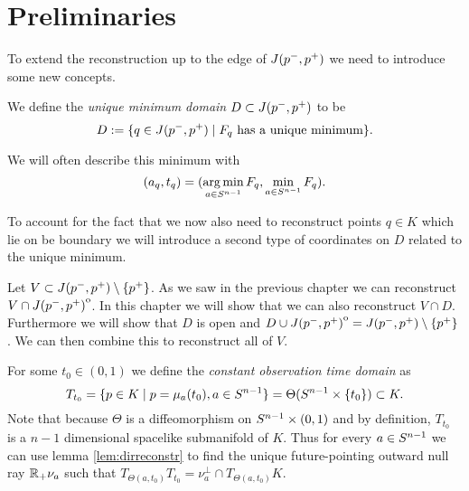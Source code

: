 \section{Preliminaries}
To extend the reconstruction up to the edge of $J(p^-,p^+)$ we need to introduce some new concepts.

\begin{definition}\label{def:uniquemindomain}
    We define the \emph{unique minimum domain} $D\subset J(p^-,p^+)$ to be 
    \begin{equation}
        D:=\{q\in J(p^-,p^+) \mid F_q\text{ has a unique minimum}\}.
    \end{equation}

    We will often describe this minimum with 
    \[
        (a_q,t_q)=(\operatorname*{arg\,min}_{a\in S^{n-1}} F_q, \min_{a\in S^{n-1}} F_q).
    \]
\end{definition}

\begin{remark}
    To account for the fact that we now also need to reconstruct points $q\in K$ which lie on be boundary we will introduce a second type of coordinates on $D$ related to the unique minimum.
    
    Let $V\subset J(p^-,p^+)\setminus \{p^+\}$. As we saw in the previous chapter we can reconstruct $V\cap {\kern0ptJ(p^-,p^+)}^{\mathrm{o}}$. In this chapter we will show that we can also reconstruct $V\cap D$. Furthermore we will show that $D$ is open and $D\cup {\kern0ptJ(p^-,p^+)}^{\mathrm{o}} = J(p^-,p^+)  \setminus \{p^+\}$. We can then combine this to reconstruct all of $V$.
\end{remark}


\begin{definition} For some $t_0\in (0,1)$ we define the \emph{constant observation time domain} as 
\begin{equation}
    T_{t_0} = \{p\in K \mid p=\mu_a(t_0), a\in S^{n-1}\} = \Theta(S^{n-1}\times \{t_0\}) \subset K.
\end{equation}
Note that because $\Theta$ is a diffeomorphism on $S^{n-1} \times (0,1)$ and by definition, $T_{t_0}$ is a $n-1$ dimensional spacelike submanifold of $K$. 
Thus for every $a\in S^{n-1}$ we can use lemma \ref{lem:dirreconstr} to find the unique future-pointing outward null ray $\mathbb{R}_+\nu_a$ such that $T_{\Theta(a,t_0)}T_{t_0} = \nu_a^\perp \cap T_{\Theta(a,t_0)}K$.
\end{definition}

